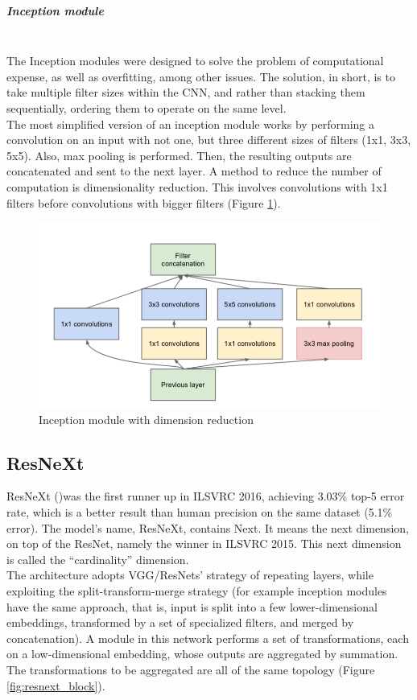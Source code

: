 \documentclass{article}
\begin{document}
\subparagraph{Inception module}\mbox{}\\
The Inception modules were designed to solve the problem of computational expense, as well as overfitting, among other issues. The solution, in short, is to take multiple filter sizes within the CNN, and rather than stacking them sequentially, ordering them to operate on the same level. \\
 The most simplified version of an inception module works by performing a convolution on an input with not one, but three different sizes of filters (1x1, 3x3, 5x5). Also, max pooling is performed. Then, the resulting outputs are concatenated and sent to the next layer.
A method to reduce the number of computation is dimensionality reduction. This involves convolutions with 1x1 filters before convolutions with bigger filters (Figure \ref{fig:incmodule}).
\newpage
\begin{figure}[h]
	\centering
	\includegraphics[width=0.5\linewidth]{image/inc_module}
	\caption{Inception module with dimension reduction}
	\label{fig:incmodule}
\end{figure}




\subsection{ResNeXt}
ResNeXt (\cite{resneXt})was the first runner up in ILSVRC 2016, achieving 3.03\% top-5 error rate, which is a better result than human precision on the same dataset (5.1\% error). The model's name, ResNeXt, contains Next. It means the next dimension, on top of the ResNet, namely the winner in ILSVRC 2015. This next dimension is called the “cardinality” dimension.\\
The architecture adopts VGG/ResNets' strategy of repeating layers, while
exploiting the split-transform-merge strategy (for example inception modules have the same approach, that is, input is split into a few lower-dimensional embeddings, transformed by a set of specialized filters, and merged by concatenation). 
A module in this network performs a set of transformations, each on a low-dimensional embedding, whose outputs are aggregated by summation. The transformations to be aggregated are all of the same topology (Figure \ref{fig:resnext_block}).\\
\end{document}
